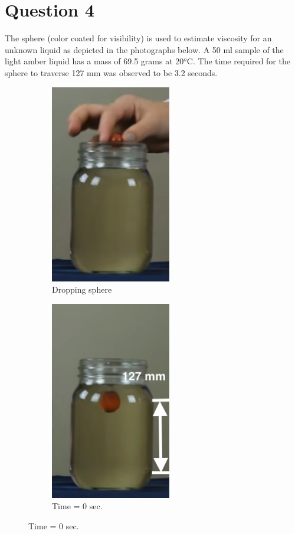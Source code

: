 \documentclass[12pt]{article}
\begin{document}
\section*{Question 4}
The sphere (color coated for visibility) is used to estimate viscosity for an unknown liquid as depicted in the photographs below. A 50 ml sample of the light amber liquid has a mass of 69.5 grams at 20$^o$C. The time required for the sphere to traverse 127 mm was observed to be 3.2 seconds.
\begin{figure}[h!]
\centering
\begin{subfigure}{.3\textwidth}
  \centering
  \includegraphics[width=.4\linewidth]{drop.png}
  \caption{Dropping sphere}
  \label{fig:sub1}
\end{subfigure}%
\begin{subfigure}{.3\textwidth}
  \centering
  \includegraphics[width=.4\linewidth]{begin.png}
  \caption{Time = 0 sec.}

\end{subfigure}
\end{figure}
\end{document}
